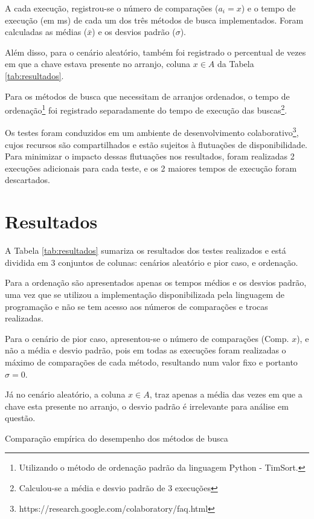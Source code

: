 \documentclass[12pt]{article}
\begin{document}
A cada execução, registrou-se o número de comparações ($a_{i} = x$) e o tempo de execução (em ms) de cada um dos três métodos de busca implementados. Foram calculadas as médias ($\bar{x}$) e os desvios padrão ($\sigma$).

Além disso, para o cenário aleatório, também foi registrado o percentual de vezes em que a chave estava presente no arranjo, coluna $x \in A$ da Tabela \ref{tab:resultados}.

Para os métodos de busca que necessitam de arranjos ordenados, o tempo de ordenação\footnote{Utilizando o método de ordenação padrão da linguagem Python - TimSort.} foi registrado separadamente do tempo de execução das buscas\footnote{Calculou-se a média e desvio padrão de 3 execuções}.

Os testes foram conduzidos em um ambiente de desenvolvimento colaborativo\footnote{https://research.google.com/colaboratory/faq.html}, cujos recursos são compartilhados e estão sujeitos à flutuações de disponibilidade. Para minimizar o impacto dessas flutuações nos resultados, foram realizadas 2 execuções adicionais para cada teste, e os 2 maiores tempos de execução foram descartados.

\section{Resultados}
A Tabela \ref{tab:resultados} sumariza os resultados dos testes realizados e está dividida em 3 conjuntos de colunas: cenários aleatório e pior caso, e ordenação.

Para a ordenação são apresentados apenas os tempos médios e os desvios padrão, uma vez que se utilizou a implementação disponibilizada pela linguagem de programação e não se tem acesso aos números de comparações e trocas realizadas.

Para o cenário de pior caso, apresentou-se o número de comparações (Comp. $x$), e não a média e desvio padrão, pois em todas as execuções foram realizadas o máximo de comparações de cada método, resultando num valor fixo e portanto $\sigma = 0$.

Já no cenário aleatório, a coluna $x \in A$, traz apenas a média das vezes em que a chave esta presente no arranjo, o desvio padrão é irrelevante para análise em questão.

\begin{table}[h]
    \centering
    \resizebox{\textwidth}{!}{
        
    }
    \caption{Comparação empírica do desempenho dos métodos de busca}
    \label{tab:resultados}
\end{table} 
\end{document}
